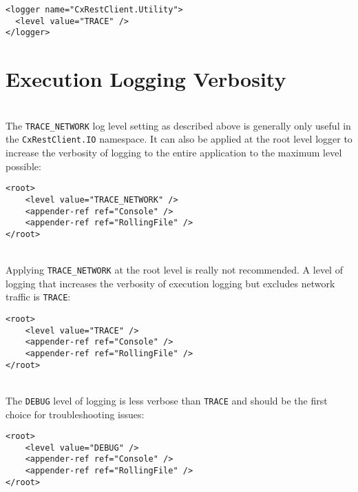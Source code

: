 \begin{lstlisting}
<logger name="CxRestClient.Utility">
  <level value="TRACE" />
</logger>
\end{lstlisting}

\section{Execution Logging Verbosity}

\noindent\\The \texttt{TRACE\_NETWORK} log level setting as described above is generally only useful in the 
\texttt{CxRestClient.IO} namespace.  It can also be applied at the root level logger to increase the
verbosity of logging to the entire application to the maximum level possible:

\begin{lstlisting}
<root>
    <level value="TRACE_NETWORK" />
    <appender-ref ref="Console" />
    <appender-ref ref="RollingFile" />
</root>
\end{lstlisting}

\noindent\\Applying \texttt{TRACE\_NETWORK} at the root level is really not recommended.  A level of logging that increases the verbosity of execution
logging but excludes network traffic is \texttt{TRACE}:

\begin{lstlisting}
<root>
    <level value="TRACE" />
    <appender-ref ref="Console" />
    <appender-ref ref="RollingFile" />
</root>
\end{lstlisting}

\noindent\\The \texttt{DEBUG} level of logging is less verbose than \texttt{TRACE} and should be the first choice for troubleshooting issues:

\begin{lstlisting}
<root>
    <level value="DEBUG" />
    <appender-ref ref="Console" />
    <appender-ref ref="RollingFile" />
</root>
\end{lstlisting}
